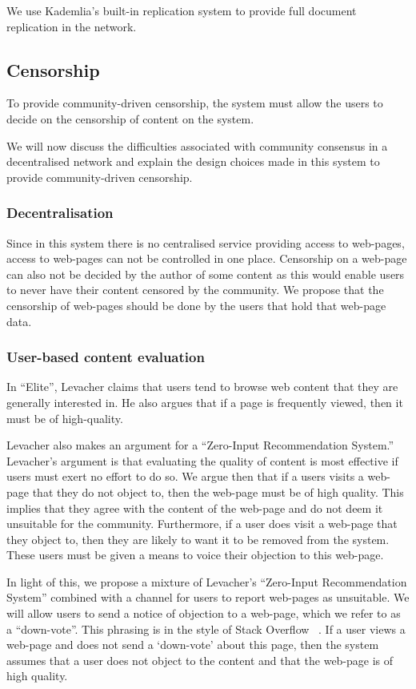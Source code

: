 We use Kademlia's built-in replication system to provide full document replication in the network.


\subsection{Censorship}

To provide community-driven censorship, the system must allow the users to decide on the censorship of content
on the system.

We will now discuss the difficulties associated with community consensus in a decentralised network and explain the
design choices made in this system to provide community-driven censorship.

\subsubsection{Decentralisation}

Since in this system there is no centralised service providing access to web-pages, access to web-pages can not be
controlled in one place.
Censorship on a web-page can also not be decided by the author of some content as this would enable users to never
have their content censored by the community.
We propose that the censorship of web-pages should be done by the users that hold that web-page data.

\subsubsection{User-based content evaluation}

In ``Elite'', Levacher claims that users tend to browse web content that they are generally interested in.
He also argues that if a page is frequently viewed, then it must be of high-quality.

Levacher also makes an argument for a ``Zero-Input Recommendation System.'' Levacher's argument is that evaluating the quality of
content is most effective if users must exert no effort to do so. We argue then that if a users visits a web-page that they do not
object to, then the web-page must be of high quality. This implies that they agree with the content of the web-page and do not deem
it unsuitable for the community. Furthermore, if a user does visit a web-page that they object to, then they are likely to want it to be removed from the system. These users must be given a means to voice their objection to this web-page.

In light of this, we propose a mixture of Levacher's ``Zero-Input Recommendation System'' combined with a channel for users to
report web-pages as unsuitable.
We will allow users to send a notice of objection to a web-page, which we refer to as a ``down-vote''. This phrasing is in the
style of Stack Overflow ~\cite{stackoverflow}. If a user views a web-page and does not send a `down-vote' about this page, then the
system assumes that a user does not object to the content and that the web-page is of high quality.

